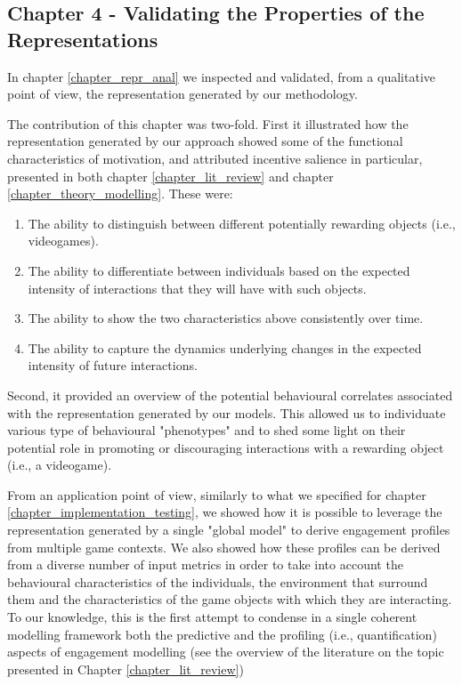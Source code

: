 \subsection{Chapter 4 - Validating the Properties of the Representations}
\label{discussion_chapter_four}
In chapter \ref{chapter_repr_anal} we inspected and validated, from a qualitative point of view, the representation generated by our methodology.

The contribution of this chapter was two-fold. First it illustrated how the representation generated by our approach showed some of the functional characteristics of motivation, and attributed incentive salience in particular, presented in both chapter \ref{chapter_lit_review} and chapter \ref{chapter_theory_modelling}. These were:

\begin{enumerate}
    \item The ability to distinguish between different potentially rewarding objects (i.e., videogames).
    \item The ability to differentiate between individuals based on the expected intensity of interactions that they will have with such objects.
    \item The ability to show the two characteristics above consistently over time.
    \item The ability to capture the dynamics underlying changes in the expected intensity of future interactions.
\end{enumerate}

Second, it provided an overview of the potential behavioural correlates associated with the representation generated by our models. This allowed us to individuate various type of behavioural "phenotypes" and to shed some light on their potential role in promoting or discouraging interactions with a rewarding object (i.e., a videogame).

From an application point of view, similarly to what we specified for chapter \ref{chapter_implementation_testing}, we showed how it is possible to leverage the representation generated by a single "global model" to derive engagement profiles from multiple game contexts. We also showed how these profiles can be derived from a diverse number of input metrics in order to take into account the behavioural characteristics of the individuals, the environment that surround them and the characteristics of the game objects with which they are interacting. To our knowledge, this is the first attempt to condense in a single coherent modelling framework both the predictive and the profiling (i.e., quantification) aspects of engagement modelling (see the overview of the literature on the topic presented in Chapter \ref{chapter_lit_review})


